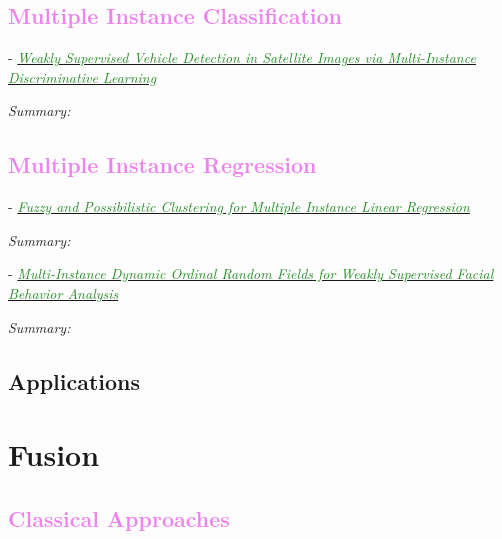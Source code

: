 \documentclass[]{article}
\newcommand{\paperentry}[4]{
            \hangindent=1cm
            \textcolor{red}{\cite{#1}} - \href{run:../References/#3}{\textcolor{ForestGreen}{\textit{#2}}}
            
            \noindent            
            \begin{minipage}[t]{0.1\linewidth}\hfill\end{minipage}
            \begin{minipage}[t]{0.8\linewidth}\textcolor{NavyBlue}{{\textit{Summary:}}}#4\end{minipage}
            \vspace{.25cm}
          }
\begin{document}
	
	\textcolor{Violet}{\subsection{Multiple Instance Classification}}
	
		\paperentry{Cao2016VehicleDetectionMIL}
		{Weakly Supervised Vehicle Detection in Satellite Images via Multi-Instance Discriminative Learning}
		{Multiple_Instance_Learning/Cao2016VehicleDetectionMIL.pdf}
		{}
		
	
	\textcolor{Violet}{\subsection{Multiple Instance Regression}}
	
		\paperentry{Trabelsi2018FuzzyClusteringMILRegression}
		{Fuzzy and Possibilistic Clustering for Multiple Instance Linear Regression}
		{Multiple_Instance_Learning/Trabelsi2018FuzzyClusteringMILRegression.pdf}
		{}
		
		\paperentry{Ruiz2018MIDynamicOrdinalRegression}
		{Multi-Instance Dynamic Ordinal Random Fields for Weakly Supervised Facial Behavior Analysis}
		{Multiple_Instance_Learning/Ruiz2018MIDynamicOrdinalRegression.pdf}
		{}
		
%		
%		


	\subsection{Applications}
	
		


\section{Fusion}
	
	\textcolor{Violet}{\subsection{Classical Approaches}}
\end{document}
